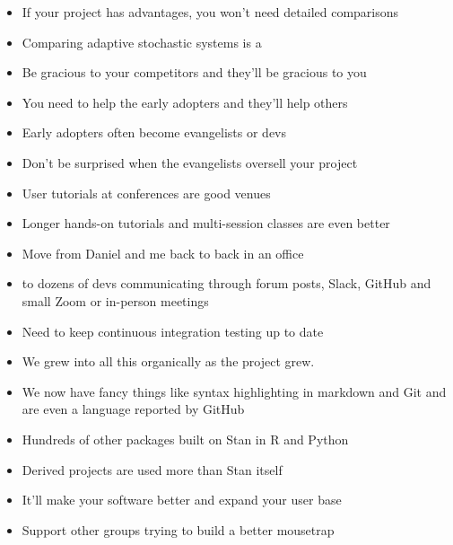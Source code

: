 \documentclass[9pt]{report}
\begin{document}
\begin{itemize}
  \item If your project has advantages, you won't need detailed
    comparisons
  \item Comparing adaptive stochastic systems is a 
  \item Be gracious to your competitors and they'll be gracious to you 
\end{itemize}
  
\begin{itemize}
\item You need to help the early adopters and they'll help others
\item Early adopters often become evangelists or devs
\item Don't be surprised when the evangelists oversell your project
\item User tutorials at conferences are good venues
\item Longer hands-on tutorials and multi-session classes are even better
\end{itemize}

\begin{itemize}
\item Move from Daniel and me back to back in an office
\item to dozens of devs communicating through forum posts, Slack,
  GitHub and small Zoom or in-person meetings
\item Need to keep continuous integration testing up to date
\item We grew into all this organically as the project grew.
\item We now have fancy things like syntax highlighting in markdown
  and Git and are even a language reported by GitHub
\end{itemize}

\begin{itemize}
\item Hundreds of other packages built on Stan in R and Python
\item Derived projects are used more than Stan itself
\item It'll make your software better and expand your user base
\item Support other groups trying to build a better mousetrap
\end{itemize}
\end{document}
